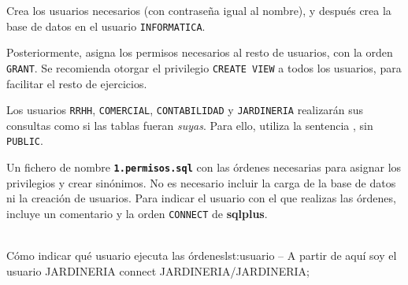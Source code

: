 \begin{homeworkProblem}
  Crea los usuarios necesarios (con contraseña igual al nombre), y después crea la base de datos en el usuario \texttt{INFORMATICA}.

  Posteriormente, asigna los permisos necesarios al resto de usuarios, con la orden \texttt{GRANT}.   Se recomienda otorgar el privilegio \texttt{CREATE VIEW} a todos los usuarios, para facilitar el resto de ejercicios.
  
  Los usuarios \texttt{RRHH}, \texttt{COMERCIAL}, \texttt{CONTABILIDAD} y \texttt{JARDINERIA} realizarán sus consultas como si las tablas fueran \textit{suyas}. Para ello, utiliza la sentencia , sin \texttt{PUBLIC}.

  \begin{Aviso}
    Un fichero de nombre \textbf{\texttt{1.permisos.sql}} con las órdenes necesarias para asignar los privilegios y crear sinónimos. No es necesario incluir la carga de la base de datos ni la creación de usuarios.
    Para indicar el usuario con el que realizas las órdenes, incluye un comentario y la orden \texttt{CONNECT} de \textbf{sqlplus}.
    \\
    \\
\begin{listadosql}{Cómo indicar qué usuario ejecuta las órdenes}{lst:usuario}
-- A partir de aquí soy el usuario JARDINERIA
connect JARDINERIA/JARDINERIA;
\end{listadosql}
  \end{Aviso}

\end{homeworkProblem}
